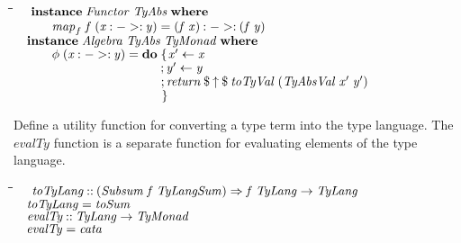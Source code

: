 \documentclass[10pt]{article}
\newlength{\lwidth}\setlength{\lwidth}{4.5cm}
\newlength{\cwidth}\setlength{\cwidth}{8mm} %
\newcommand{\Conid}[1]{\mathit{#1}}
\newcommand{\Varid}[1]{\mathit{#1}}
\begin{document}
\begin{tabbing}
\qquad\=\hspace{\lwidth}\=\hspace{\cwidth}\=\+\kill
${\hskip1.00em\relax\mathbf{instance}\;\Conid{Functor}\;\Conid{TyAbs}\;\mathbf{where}}$\\
${\hskip1.00em\relax\hskip2.00em\relax\Varid{map}_{f}\;\Varid{f}\;(\Varid{x}\mathbin{:->:}\Varid{y})\mathrel{=}(\Varid{f}\;\Varid{x})\mathbin{:->:}(\Varid{f}\;\Varid{y})}$\\
${}$\\
${\hskip1.00em\relax\mathbf{instance}\;\Conid{Algebra}\;\Conid{TyAbs}\;\Conid{TyMonad}\;\mathbf{where}}$\\
${\hskip1.00em\relax\hskip2.00em\relax\Varid{\phi}\;(\Varid{x}\mathbin{:->:}\Varid{y})\mathrel{=}\mathbf{do}\;\{\mskip1.5mu \Varid{x'}\leftarrow \Varid{x}}$\\
${\hskip1.00em\relax\hskip2.00em\relax\phantom{\Varid{\phi}\;(\Varid{x}\mathbin{:->:}\Varid{y})\mathrel{=}\mathbf{do}\;\mbox{}};\Varid{y'}\leftarrow \Varid{y}}$\\
${\hskip1.00em\relax\hskip2.00em\relax\phantom{\Varid{\phi}\;(\Varid{x}\mathbin{:->:}\Varid{y})\mathrel{=}\mathbf{do}\;\mbox{}};\Varid{return}\mathbin{\$}\Varid{\uparrow}\mathbin{\$}\Varid{toTyVal}\;(\Conid{TyAbsVal}\;\Varid{x'}\;\Varid{y'})}$\\
${\hskip1.00em\relax\hskip2.00em\relax\phantom{\Varid{\phi}\;(\Varid{x}\mathbin{:->:}\Varid{y})\mathrel{=}\mathbf{do}\;\mbox{}}\mskip1.5mu\}}$
\end{tabbing}
Define a utility function for converting a type term into the type
language.  The \ensuremath{\Varid{evalTy}} function is a separate function for evaluating
elements of the type language.

\begin{tabbing}
\qquad\=\hspace{\lwidth}\=\hspace{\cwidth}\=\+\kill
${\hskip1.00em\relax\Varid{toTyLang}\mathbin{::}(\Conid{Subsum}\;\Varid{f}\;\Conid{TyLangSum})\Rightarrow \Varid{f}\;\Conid{TyLang}\to \Conid{TyLang}}$\\
${\hskip1.00em\relax\Varid{toTyLang}\mathrel{=}\Varid{toSum}}$\\
${}$\\
${\hskip1.00em\relax\Varid{evalTy}\mathbin{::}\Conid{TyLang}\to \Conid{TyMonad}}$\\
${\hskip1.00em\relax\Varid{evalTy}\mathrel{=}\Varid{cata}}$
\end{tabbing}
\end{document}

